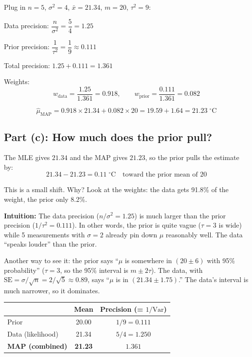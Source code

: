 \documentclass[11pt]{article}
\begin{document}
Plug in $n = 5$, $\sigma^2 = 4$, $\bar{x} = 21.34$, $m = 20$, $\tau^2 = 9$:

Data precision: $\dfrac{n}{\sigma^2} = \dfrac{5}{4} = 1.25$

\medskip
Prior precision: $\dfrac{1}{\tau^2} = \dfrac{1}{9} \approx 0.111$

\medskip
Total precision: $1.25 + 0.111 = 1.361$

\medskip
Weights:
\[
  w_{\text{data}} = \frac{1.25}{1.361} = 0.918, \qquad w_{\text{prior}} = \frac{0.111}{1.361} = 0.082
\]

\[
  \boxed{\hat\mu_{\text{MAP}} = 0.918 \times 21.34 + 0.082 \times 20 = 19.59 + 1.64 = 21.23\;{}^\circ\text{C}}
\]


\subsection*{Part (c): How much does the prior pull?}

The MLE gives $21.34$ and the MAP gives $21.23$, so the prior pulls the estimate by:
\[
  21.34 - 21.23 = 0.11\;{}^\circ\text{C} \quad\text{toward the prior mean of } 20
\]

This is a small shift. Why? Look at the weights: the data gets 91.8\% of the weight, the prior only 8.2\%.

\textbf{Intuition:} The data precision ($n/\sigma^2 = 1.25$) is much larger than the prior precision ($1/\tau^2 = 0.111$). In other words, the prior is quite vague ($\tau = 3$ is wide) while 5 measurements with $\sigma = 2$ already pin down $\mu$ reasonably well. The data ``speaks louder'' than the prior.

\medskip
Another way to see it: the prior says ``$\mu$ is somewhere in $(20 \pm 6)$ with 95\% probability'' ($\tau = 3$, so the 95\% interval is $m \pm 2\tau$). The data, with $\text{SE} = \sigma/\sqrt{n} = 2/\sqrt{5} \approx 0.89$, says ``$\mu$ is in $(21.34 \pm 1.75)$.'' The data's interval is much narrower, so it dominates.

\begin{center}
\renewcommand{\arraystretch}{1.4}
\begin{tabular}{lcc}
\hline
& \textbf{Mean} & \textbf{Precision (= $1/\text{Var}$)} \\
\hline
Prior & 20.00 & $1/9 = 0.111$ \\
Data (likelihood) & 21.34 & $5/4 = 1.250$ \\
\textbf{MAP (combined)} & \textbf{21.23} & $\mathbf{1.361}$ \\
\hline
\end{tabular}
\end{center}
\end{document}
